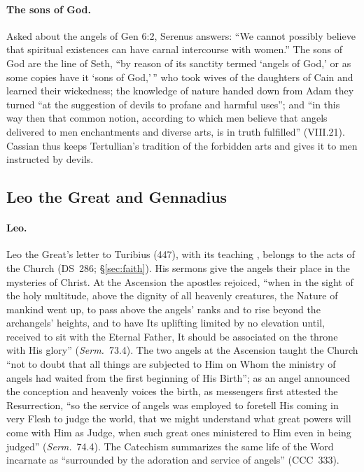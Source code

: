 \paragraph{The sons of God.} Asked about the angels of Gen 6:2, Serenus
answers: ``We cannot possibly believe that spiritual existences can have
carnal intercourse with women.'' The sons of God are the line of Seth,
``by reason of its sanctity termed `angels of God,' or as some copies have
it `sons of God,'\,'' who took wives of the daughters of Cain and learned
their wickedness; the knowledge of nature handed down from Adam they
turned ``at the suggestion of devils to profane and harmful uses''; and
``in this way then that common notion, according to which men believe
that angels delivered to men enchantments and diverse arts, is in truth
fulfilled'' (VIII.21). Cassian thus keeps Tertullian's tradition of the
forbidden arts and gives it to men instructed by devils.

\sectionguard
\subsection{Leo the Great and Gennadius}\label{sec:fl-leo-gennadius}

\paragraph{Leo.} Leo the Great's letter to Turibius (447), with its
teaching , belongs to the acts of the Church (DS~286; \S\ref{sec:faith}). His
sermons give the angels their place in the mysteries of Christ. At the
Ascension the apostles rejoiced, ``when in the sight of the holy
multitude, above the dignity of all heavenly creatures, the Nature of
mankind went up, to pass above the angels' ranks and to rise beyond the
archangels' heights, and to have Its uplifting limited by no elevation
until, received to sit with the Eternal Father, It should be associated
on the throne with His glory'' (\emph{Serm.}\ 73.4). The two angels at the
Ascension taught the Church ``not to doubt that all things are subjected
to Him on Whom the ministry of angels had waited from the first beginning
of His Birth''; as an angel announced the conception and heavenly voices
the birth, as messengers first attested the Resurrection, ``so the
service of angels was employed to foretell His coming in very Flesh to
judge the world, that we might understand what great powers will come
with Him as Judge, when such great ones ministered to Him even in being
judged'' (\emph{Serm.}\ 74.4). The Catechism summarizes the same life of
the Word incarnate as ``surrounded by the adoration and service of
angels'' (CCC~333). 

